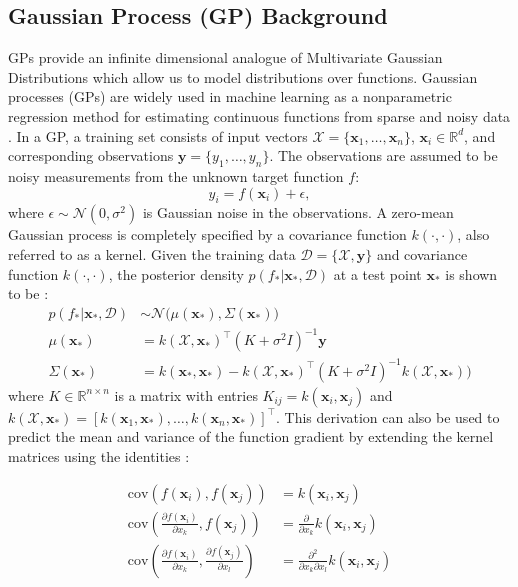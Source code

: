 \documentclass[letterpaper, 10 pt, conference]{ieeeconf}  %
\newcommand{\by}{\mathbf{y}}
\newcommand{\bx}{\mathbf{x}}
\newcommand{\mX}{\mathcal{X}}
\newcommand{\mD}{\mathcal{D}}
\newcommand{\mN}{\mathcal{N}}
\begin{document}
\subsection{Gaussian Process (GP) Background} 
GPs provide an infinite dimensional analogue of Multivariate
Gaussian Distributions which allow us to model distributions over
functions. Gaussian processes (GPs) are widely used in machine learning as a nonparametric regression method for estimating continuous functions from sparse and noisy data \cite{rasmussen2010gaussian}.
In a GP, a training set consists of input vectors $\mX = \{\bx_1, \ldots, \bx_n\}$, $\bx_i \in \mathbb{R}^d$, and corresponding observations $\by = \{y_1, \ldots, y_n\}$. The observations are assumed to be noisy measurements from the unknown target function $f$:
\begin{equation}
y_i = f(\bx_i) + \epsilon,
\end{equation}
where $\epsilon \sim \mN(0,\sigma^2)$ is Gaussian noise in the observations.
A zero-mean Gaussian process is completely specified by a covariance function $k(\cdot,\cdot)$, also referred to as a kernel.
Given the training data $\mD = \{\mX, \by\}$ and covariance function $k(\cdot,\cdot)$, the posterior density $p(f_*|\bx_*,\mD)$ at a test point $\bx_{*}$ is shown to be \cite{rasmussen2010gaussian}:
\begin{align*}
	p(f_*|\bx_*,\mD) &\sim \mN\big(\mu(\bx_*), \Sigma(\bx_*)\big) \\
	\mu(\bx_*) &= k(\mX,\bx_*)^{\intercal}(K + \sigma^2I)^{-1}\by \\
	\Sigma(\bx_*) &= k(\bx_*,\bx_*)-k(\mX,\bx_*)^{\intercal}(K+\sigma^2I)^{-1}k(\mX,\bx_*)\big) 
\end{align*}
where $K \in \mathbb{R}^{n \times n}$ is a matrix with entries $K_{ij} = k(\bx_i,\bx_j)$ and $k(\mX,\bx_*) = [k(\bx_1,\bx_*),\ldots,k(\bx_n,\bx_*)]^{\intercal}$. 
This derivation can also be used to predict the mean and variance of the function gradient by extending the kernel matrices using the identities \cite{solak2003derivative}:

\vspace{-2ex}
\begin{align}
	\text{cov}\left(f(\bx_i), f(\bx_j) \right) &=  k(\bx_i, \bx_j) \\
	\text{cov}\left(\frac{\partial f (\bx_i)}{\partial x_k}, f(\bx_j) \right) &= \frac{\partial}{\partial x_k} k(\bx_i, \bx_j) \label{eq:mean_gradient}\\
	\text{cov}\left(\frac{\partial f (\bx_i)}{\partial x_k}, \frac{\partial f (\bx_j)}{\partial x_l} \right) &= \frac{\partial^2}{\partial x_k \partial x_l} k(\bx_i, \bx_j)\label{eq:cov_gradient}
\end{align}
\end{document}
